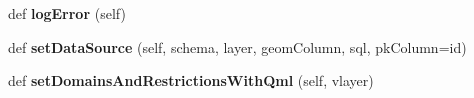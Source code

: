 \begin{DoxyCompactItemize}
def {\bfseries log\+Error} (self)
\item 
\mbox{\label{class_dsg_tools_1_1_factories_1_1_layer_loader_factory_1_1edgv_layer_loader_1_1_e_d_g_v_layer_loader_aef564f84f140b11a9c6a7d40030ede19}} 
def {\bfseries set\+Data\+Source} (self, schema, layer, geom\+Column, sql, pk\+Column=\textquotesingle{}id\textquotesingle{})
\item 
\mbox{\label{class_dsg_tools_1_1_factories_1_1_layer_loader_factory_1_1edgv_layer_loader_1_1_e_d_g_v_layer_loader_a4c2efee85a8d3975c98892954370f6a6}} 
def {\bfseries set\+Domains\+And\+Restrictions\+With\+Qml} (self, vlayer)
\end{DoxyCompactItemize}

